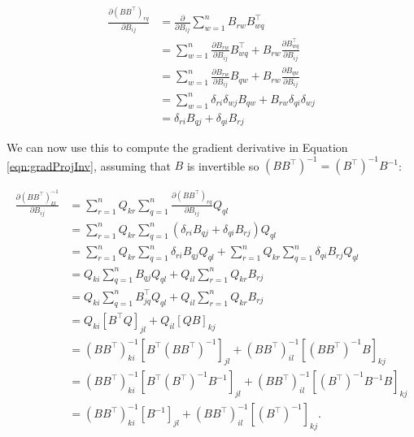 \documentclass{article}
\theoremstyle{definition}
\begin{document}
\begin{equation}
    \label{eqn:gradProjElement}
    \begin{split}
        \frac{\partial (BB^\top)_{rq}}{\partial B_{ij}} &= \frac{\partial}{\partial B_{ij}} \sum_{w=1}^{n} B_{rw}B_{wq}^\top \\ 
        &= \sum_{w=1}^{n} \frac{\partial B_{rw}}{\partial B_{ij}} B_{wq}^\top + B_{rw} \frac{\partial B_{wq}^\top}{\partial B_{ij}} \\
        & = \sum_{w=1}^{n} \frac{\partial B_{rw}}{\partial B_{ij}} B_{qw} + B_{rw} \frac{\partial B_{qw}}{\partial B_{ij}} \\ 
        & = \sum_{w=1}^{n} \delta_{ri} \delta_{wj} B_{qw} + B_{rw} \delta_{qi} \delta_{wj} \\ 
        & = \delta_{ri} B_{qj} + \delta_{qi} B_{rj}
    \end{split}
\end{equation}

We can now use this to compute the gradient derivative in Equation \ref{eqn:gradProjInv}, assuming that $B$ is invertible so $(BB^\top)^{-1} = (B^\top)^{-1} B^{-1}$:

\begin{equation}
    \label{eqn:gradProjInvFinal}
    \begin{split}
        \frac{\partial (BB^\top)^{-1}_{kl}}{\partial B_{ij}} &= \sum_{r=1}^{n} Q_{kr} \sum_{q=1}^{n} \frac{\partial (BB^\top)_{rq}}{\partial B_{ij}} Q_{ql} \\ 
        & = \sum_{r=1}^{n} Q_{kr} \sum_{q=1}^{n} (\delta_{ri} B_{qj} + \delta_{qi} B_{rj}) Q_{ql} \\
        & = \sum_{r=1}^{n} Q_{kr} \sum_{q=1}^{n} \delta_{ri} B_{qj} Q_{ql} + \sum_{r=1}^{n} Q_{kr} \sum_{q=1}^{n} \delta_{qi} B_{rj} Q_{ql} \\ 
        & = Q_{ki} \sum_{q=1}^{n} B_{qj} Q_{ql} + Q_{il} \sum_{r=1}^{n} Q_{kr} B_{rj}  \\ 
        & = Q_{ki} \sum_{q=1}^{n} B^\top_{jq} Q_{ql} + Q_{il} \sum_{r=1}^{n} Q_{kr} B_{rj}  \\ 
        & = Q_{ki} [B^\top Q]_{jl} + Q_{il} [QB]_{kj} \\ 
        & = (BB^\top)^{-1}_{ki} [B^\top (BB^\top)^{-1}]_{jl} + (BB^\top)^{-1}_{il} [(BB^\top)^{-1} B]_{kj} \\ 
        & = (BB^\top)^{-1}_{ki} [B^\top (B^\top)^{-1} B^{-1}]_{jl} + (BB^\top)^{-1}_{il} [(B^\top)^{-1} B^{-1} B]_{kj} \\ 
        & = (BB^\top)^{-1}_{ki} [B^{-1}]_{jl} + (BB^\top)^{-1}_{il} [(B^\top)^{-1}]_{kj}.
    \end{split}
\end{equation}
\end{document}
